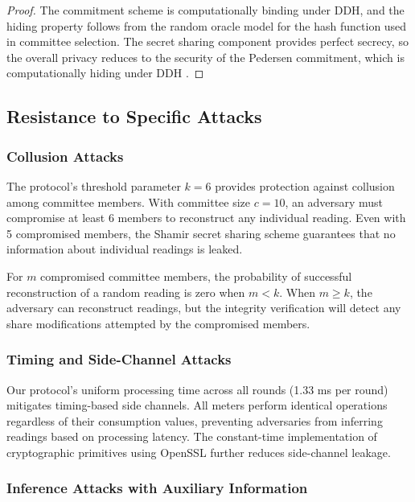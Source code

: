 \documentclass[conference]{IEEEtran}
\begin{document}
\begin{proof}
The commitment scheme is computationally binding under DDH, and the hiding property follows from the random oracle model for the hash function used in committee selection. The secret sharing component provides perfect secrecy, so the overall privacy reduces to the security of the Pedersen commitment, which is computationally hiding under DDH \cite{pedersen1991non}.
\end{proof}

\subsection{Resistance to Specific Attacks}

\subsubsection{Collusion Attacks}

The protocol's threshold parameter \(k = 6\) provides protection against collusion among committee members. With committee size \(c = 10\), an adversary must compromise at least 6 members to reconstruct any individual reading. Even with 5 compromised members, the Shamir secret sharing scheme guarantees that no information about individual readings is leaked.

For \(m\) compromised committee members, the probability of successful reconstruction of a random reading is zero when \(m < k\). When \(m \geq k\), the adversary can reconstruct readings, but the integrity verification will detect any share modifications attempted by the compromised members.

\subsubsection{Timing and Side-Channel Attacks}

Our protocol's uniform processing time across all rounds (1.33 ms per round) mitigates timing-based side channels. All meters perform identical operations regardless of their consumption values, preventing adversaries from inferring readings based on processing latency. The constant-time implementation of cryptographic primitives using OpenSSL further reduces side-channel leakage.

\subsubsection{Inference Attacks with Auxiliary Information}
\end{document}
